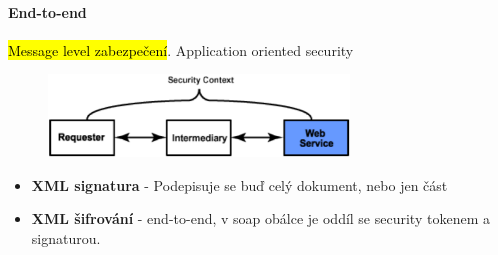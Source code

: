 \paragraph{End-to-end}
\hl{Message level zabezpečení}. Application oriented security

\begin{figure}[h!]
\centering
\includegraphics[width=80mm]{12/images/security-e2e}
\end{figure}

\begin{itemize}[itemsep=0px]
\item \textbf{XML signatura} - Podepisuje se buď celý dokument, nebo jen část
\item \textbf{XML šifrování} - end-to-end, v soap obálce je oddíl se security tokenem a signaturou.
\end{itemize}
